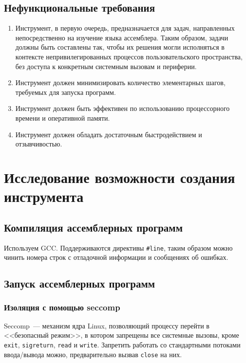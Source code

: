 \documentclass[a4paper,article,14pt]{extarticle}
\begin{document}
\subsection{Нефункциональные требования}

\begin{enumerate}
    \item Инструмент, в первую очередь, предназначается для задач, направленных непосредственно на изучение языка ассемблера. Таким образом, задачи должны быть составлены так, чтобы их решения могли исполняться в контексте непривилегированных процессов пользовательского пространства, без доступа к конкретным системным вызовам и периферии.
    \item Инструмент должен минимизировать количество элементарных шагов, требуемых для запуска программ.
    \item Инструмент должен быть эффективен по использованию процессорного времени и оперативной памяти.
    \item Инструмент должен обладать достаточным быстродействием и отзывчивостью.
\end{enumerate}

\section{Исследование возможности создания инструмента}

\subsection{Компиляция ассемблерных программ}

Используем GCC. Поддерживаются директивы \texttt{\#line}, таким образом можно чинить номера строк с отладочной информации и сообщениях об ошибках.

\subsection{Запуск ассемблерных программ}

\subsubsection{Изоляция с помощью seccomp}

Seccomp~--- механизм ядра Linux, позволяющий процессу перейти в <<безопасный режим>>, в котором запрещены все системные вызовы, кроме \texttt{exit}, \texttt{sigreturn}, \texttt{read} и \texttt{write}. Запретить работать со стандартными потоками ввода/вывода можно, предварительно вызвав \texttt{close} на них.
\end{document}
